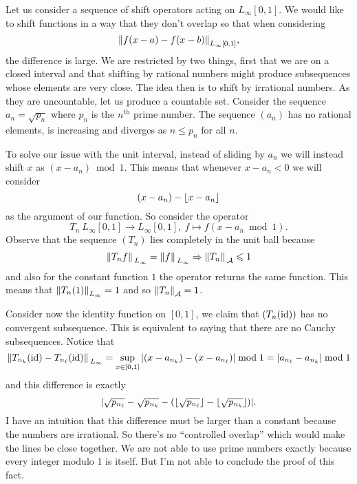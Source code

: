 \documentclass[12pt]{memoir}
\begin{document}
\begin{ptcbr}%
    Let us consider a sequence of shift operators acting on $L_\infty[0,1]$. We would like to shift functions in a way that they don't overlap so that when considering 
    $$\norm{f(x-a)-f(x-b)}_{L_\infty[0,1]},$$
    the difference is large. We are restricted by two things, first that we are on a closed interval and that shifting by rational numbers might produce subsequences whose elements are very close. The idea then is to shift by irrational numbers. As they are uncountable, let us produce a countable set. Consider the sequence $a_n=\sqrt{p_n}$ where $p_n$ is the $n^{\text{th}}$ prime number. The sequence $(a_n)$ has no rational elements, is increasing and diverges as $n\leq p_n$ for all $n$.\par 
    To solve our issue with the unit interval, instead of sliding by $a_n$ we will instead shift $x$ as $(x-a_n)\bmod 1$. This means that whenever $x-a_n<0$ we will consider 
    $$(x-a_n)-\lfloor x-a_n\rfloor$$
    as the argument of our function. So consider the operator 
    $$T_n\: L_\infty[0,1]\to L_\infty[0,1],\ f\mapsto f(x-a_n\bmod 1).$$
    Observe that the sequence $(T_n)$ lies completely in the unit ball because 
    $$\norm*{T_nf}_{L_\infty}=\norm*{f}_{L_\infty}\Rightarrow \norm*{T_n}_{\mathcal{A}}\leqslant 1$$
    and also for the constant function $1$ the operator returns the same function. This means that $\norm{T_n(1)}_{L_\infty}=1$ and so $\norm{T_n}_{\mathcal{A}}=1$.\par
    Consider now the identity function on $[0,1]$, we claim that $(T_n(\operatorname{id}))$ has no convergent subsequence. This is equivalent to saying that there are no Cauchy subsequences. Notice that 
    $$\norm*{T_{n_k}(\operatorname{id})-T_{n_\ell}(\operatorname{id})}_{L_\infty}=\sup_{x\in[0,1]}|(x-a_{n_k})-(x-a_{n_\ell})|\bmod 1=|a_{n_\ell}-a_{n_k}|\bmod 1$$
    and this difference is exactly 
    $$|\sqrt{p_{n_\ell}}-\sqrt{p_{n_k}}-(\lfloor\sqrt{p_{n_\ell}}\rfloor-\lfloor\sqrt{p_{n_k}}\rfloor)|.$$
    I have an intuition that this difference must be larger than a constant because the numbers are irrational. So there's no ``controlled overlap'' which would make the lines be close together. We are not able to use prime numbers exactly because every integer modulo 1 is itself. But I'm not able to conclude the proof of this fact.
\end{ptcbr}
\end{document}
